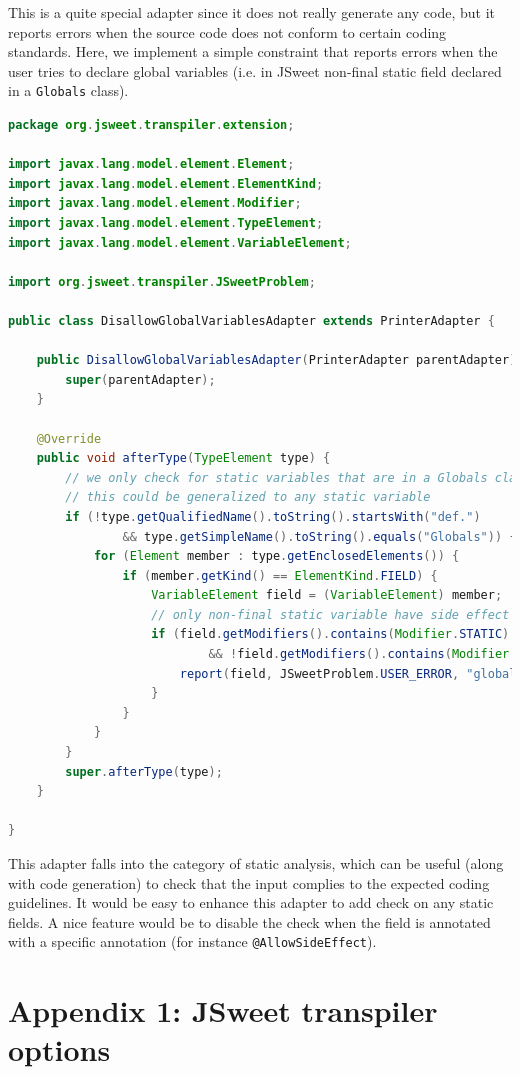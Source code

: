 \documentclass[a4paper]{report}
\begin{document}
This is a quite special adapter since it does not really generate any code, but it reports errors when the source code does not conform to certain coding standards. Here, we implement a simple constraint that reports errors when the user tries to declare global variables (i.e. in JSweet non-final static field declared in a \texttt{Globals} class).

\begin{lstlisting}[language=Java]
package org.jsweet.transpiler.extension;

import javax.lang.model.element.Element;
import javax.lang.model.element.ElementKind;
import javax.lang.model.element.Modifier;
import javax.lang.model.element.TypeElement;
import javax.lang.model.element.VariableElement;

import org.jsweet.transpiler.JSweetProblem;

public class DisallowGlobalVariablesAdapter extends PrinterAdapter {

	public DisallowGlobalVariablesAdapter(PrinterAdapter parentAdapter) {
		super(parentAdapter);
	}

	@Override
	public void afterType(TypeElement type) {
		// we only check for static variables that are in a Globals class but
		// this could be generalized to any static variable
		if (!type.getQualifiedName().toString().startsWith("def.")
				&& type.getSimpleName().toString().equals("Globals")) {
			for (Element member : type.getEnclosedElements()) {
				if (member.getKind() == ElementKind.FIELD) {
					VariableElement field = (VariableElement) member;
					// only non-final static variable have side effect
					if (field.getModifiers().contains(Modifier.STATIC)
							&& !field.getModifiers().contains(Modifier.FINAL)) {
						report(field, JSweetProblem.USER_ERROR, "global variables are not allowed");
					}
				}
			}
		}
		super.afterType(type);
	}

}
\end{lstlisting}

This adapter falls into the category of static analysis, which can be useful (along with code generation) to check that the input complies to the expected coding guidelines. It would be easy to enhance this adapter to add check on any static fields. A nice feature would be to disable the check when the field is annotated with a specific annotation (for instance \texttt{@AllowSideEffect}).

\chapter*{Appendix 1: JSweet transpiler options}
\end{document}
